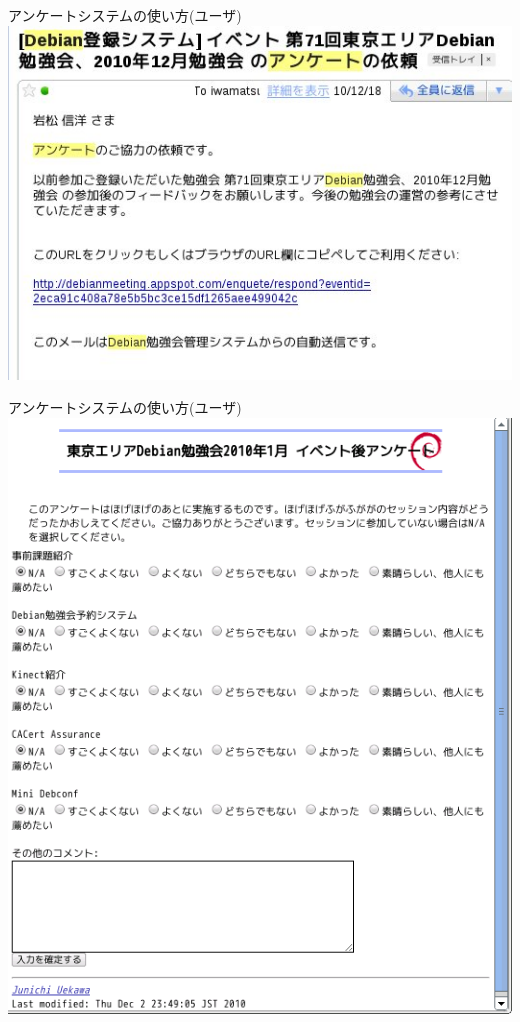 \begin{frame}{アンケートシステムの使い方(ユーザ)}
 \includegraphics[width=0.8\vsize]{image201101/enquetemail.jpg}
\end{frame}

\begin{frame}{アンケートシステムの使い方(ユーザ)}
 \includegraphics[width=0.8\vsize]{image201101/enquete-respond.png}
\end{frame}


